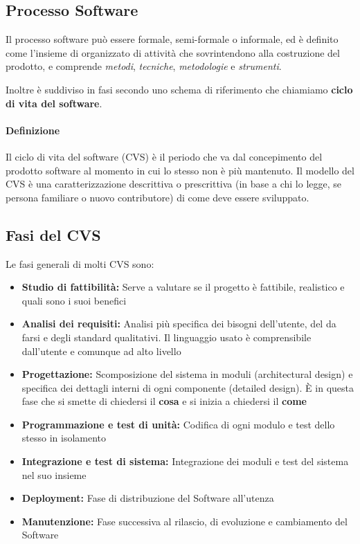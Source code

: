 \subsection{Processo Software}
    Il processo software può essere formale, semi-formale o informale, ed è definito come l'insieme di organizzato di attività che sovrintendono alla costruzione del prodotto, e comprende \textit{metodi}, \textit{tecniche}, \textit{metodologie} e \textit{strumenti}.
    
    Inoltre è suddiviso in fasi secondo uno schema di riferimento che chiamiamo \textbf{ciclo di vita del software}.
    
    \paragraph{Definizione} Il ciclo di vita del software (CVS) è il periodo che va dal concepimento del prodotto software al momento in cui lo stesso non è più mantenuto. Il modello del CVS è una caratterizzazione descrittiva o prescrittiva (in base a chi lo legge, se persona familiare o nuovo contributore) di come deve essere sviluppato.

\subsection{Fasi del CVS}
    Le fasi generali di molti CVS sono:
    \begin{itemize}
        \item \textbf{Studio di fattibilità:} Serve a valutare se il progetto è fattibile, realistico e quali sono i suoi benefici
        \item \textbf{Analisi dei requisiti:} Analisi più specifica dei bisogni dell'utente, del da farsi e degli standard qualitativi. Il linguaggio usato è comprensibile dall'utente e comunque ad alto livello
        \item \textbf{Progettazione:} Scomposizione del sistema in moduli (architectural design) e specifica dei dettagli interni di ogni componente (detailed design). È in questa fase che si smette di chiedersi il \textbf{cosa} e si inizia a chiedersi il \textbf{come}
        \item \textbf{Programmazione e test di unità:} Codifica di ogni modulo e test dello stesso in isolamento
        \item \textbf{Integrazione e test di sistema:} Integrazione dei moduli e test del sistema nel suo insieme
        \item \textbf{Deployment:} Fase di distribuzione del Software all'utenza
        \item \textbf{Manutenzione:} Fase successiva al rilascio, di evoluzione e cambiamento del Software
    \end{itemize}

